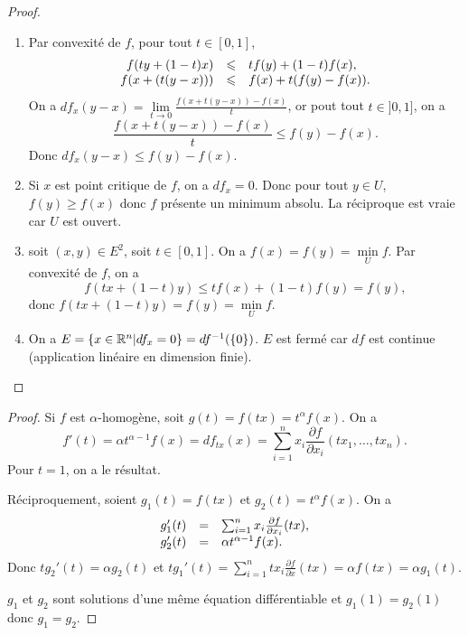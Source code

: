 \documentclass[12pt]{article}
\begin{document}
\begin{proof}
	\phantom{}
	\begin{enumerate}
		\item Par convexité de $f$, pour tout $t\in[0,1]$, 
		\begin{equation}
			\begin{array}[]{rcl}
				f(ty+(1-t)x) &\leqslant &tf(y)+(1-t)f(x),\\
				f(x+(t(y-x)))&\leqslant & f(x)+t(f(y)-f(x)).
			\end{array}
		\end{equation}
		On a $df_{x}(y-x)=\lim\limits_{t\to0}\frac{f(x+t(y-x))-f(x)}{t}$, or pout tout $t\in]0,1]$, on a 
		\begin{equation}
			\frac{f(x+t(y-x))-f(x)}{t}\leqslant f(y)-f(x).
		\end{equation}
		Donc $df_{x}(y-x)\leqslant f(y)-f(x)$.

		\item Si $x$ est point critique de $f$, on a $df_{x}=0$. Donc pour tout $y\in U$, $f(y)\geqslant f(x)$ donc $f$ présente un minimum absolu. La réciproque est vraie car $U$ est ouvert.
		
		\item soit $(x,y)\in E^{2}$, soit $t\in[0,1]$. On a $f(x)=f(y)=\min\limits_{U}f$. Par convexité de $f$, on a 
		\begin{equation}
			f(tx+(1-t)y)\leqslant tf(x)+(1-t)f(y)=f(y),
		\end{equation}
		donc $f(tx+(1-t)y)=f(y)=\min\limits_{U}f$.

		\item On a $E=\left\lbrace x\in\mathbb{R}^{n}\middle| df_{x}=0\right\rbrace=df^{-1}(\left\lbrace0\right\rbrace)$. $E$ est fermé car $df$ est continue (application linéaire en dimension finie).
	\end{enumerate}
\end{proof}

\begin{proof}
	Si $f$ est $\alpha$-homogène, soit $g(t)=f(tx)=t^{\alpha}f(x)$. On a 
	\begin{equation}
		f'(t)=\alpha t^{\alpha-1}f(x)=df_{tx}(x)=\sum_{i=1}^{n}x_i\frac{\partial f}{\partial x_i}(tx_1,\dots,tx_n).
	\end{equation}
	Pour $t=1$, on a le résultat.

	Réciproquement, soient $g_1(t)=f(tx)$ et $g_2(t)=t^{\alpha}f(x)$. On a 
	\begin{equation}
		\begin{array}[]{rcl}
			g_1'(t) &=&\sum_{i=1}^{n}x_i\frac{\partial f}{\partial x_i}(tx),\\
			g_2'(t) &=& \alpha t^{\alpha-1}f(x).
		\end{array}
	\end{equation}
	Donc $tg_2'(t)=\alpha g_2(t)$ et $tg_1'(t)=\sum_{i=1}^{n}tx_i\frac{\partial f}{\partial x}(tx)=\alpha f(tx)=\alpha g_1(t)$.

	$g_1$ et $g_2$ sont solutions d'une même équation différentiable et $g_1(1)=g_2(1)$ donc $g_1=g_2$.
\end{proof}
\end{document}
